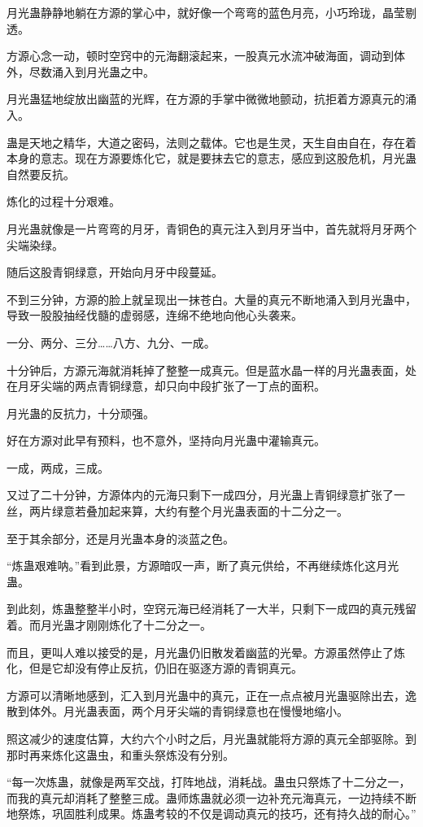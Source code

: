 \begin{this_body}
月光蛊静静地躺在方源的掌心中，就好像一个弯弯的蓝色月亮，小巧玲珑，晶莹剔透。

方源心念一动，顿时空窍中的元海翻滚起来，一股真元水流冲破海面，调动到体外，尽数涌入到月光蛊之中。

月光蛊猛地绽放出幽蓝的光辉，在方源的手掌中微微地颤动，抗拒着方源真元的涌入。

蛊是天地之精华，大道之密码，法则之载体。它也是生灵，天生自由自在，存在着本身的意志。现在方源要炼化它，就是要抹去它的意志，感应到这股危机，月光蛊自然要反抗。

炼化的过程十分艰难。

月光蛊就像是一片弯弯的月牙，青铜色的真元注入到月牙当中，首先就将月牙两个尖端染绿。

随后这股青铜绿意，开始向月牙中段蔓延。

不到三分钟，方源的脸上就呈现出一抹苍白。大量的真元不断地涌入到月光蛊中，导致一股股抽经伐髓的虚弱感，连绵不绝地向他心头袭来。

一分、两分、三分……八方、九分、一成。

十分钟后，方源元海就消耗掉了整整一成真元。但是蓝水晶一样的月光蛊表面，处在月牙尖端的两点青铜绿意，却只向中段扩张了一丁点的面积。

月光蛊的反抗力，十分顽强。

好在方源对此早有预料，也不意外，坚持向月光蛊中灌输真元。

一成，两成，三成。

又过了二十分钟，方源体内的元海只剩下一成四分，月光蛊上青铜绿意扩张了一丝，两片绿意若叠加起来算，大约有整个月光蛊表面的十二分之一。

至于其余部分，还是月光蛊本身的淡蓝之色。

“炼蛊艰难呐。”看到此景，方源暗叹一声，断了真元供给，不再继续炼化这月光蛊。

到此刻，炼蛊整整半小时，空窍元海已经消耗了一大半，只剩下一成四的真元残留着。而月光蛊才刚刚炼化了十二分之一。

而且，更叫人难以接受的是，月光蛊仍旧散发着幽蓝的光晕。方源虽然停止了炼化，但是它却没有停止反抗，仍旧在驱逐方源的青铜真元。

方源可以清晰地感到，汇入到月光蛊中的真元，正在一点点被月光蛊驱除出去，逸散到体外。月光蛊表面，两个月牙尖端的青铜绿意也在慢慢地缩小。

照这减少的速度估算，大约六个小时之后，月光蛊就能将方源的真元全部驱除。到那时再来炼化这蛊虫，和重头祭炼没有分别。

“每一次炼蛊，就像是两军交战，打阵地战，消耗战。蛊虫只祭炼了十二分之一，而我的真元却消耗了整整三成。蛊师炼蛊就必须一边补充元海真元，一边持续不断地祭炼，巩固胜利成果。炼蛊考较的不仅是调动真元的技巧，还有持久战的耐心。”


\end{this_body}
